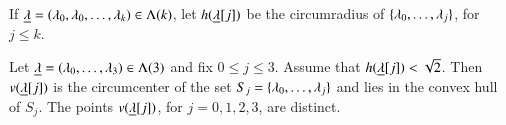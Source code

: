\begin{definition}[h]
If ${\underline{\lambda}}=(\lambda_0,\lambda_0,\ldots,\lambda_k)\in\Lambda(k)$, 
let $h({\underline{\lambda}}[j])$ be the circumradius of $\{\lambda_0,\ldots,\lambda_j\}$, for $j\le k$.
\end{definition}

\begin{lemma}\label{lemma:v2} Let ${\underline{\lambda}}=(\lambda_0,\ldots,\lambda_3)\in\Lambda(3)$ and fix $0\le j\le 3$.  Assume that $h({\underline{\lambda}}[j])<\sqrt2$.
Then $v({\underline{\lambda}}[j])$ is the circumcenter of the set $S_j =\{\lambda_0,\ldots,\lambda_j\}$ and lies in the convex hull of $S_j$.  The points $v({\underline{\lambda}}[j])$, for $j=0,1,2,3$, are distinct.
\end{lemma}


